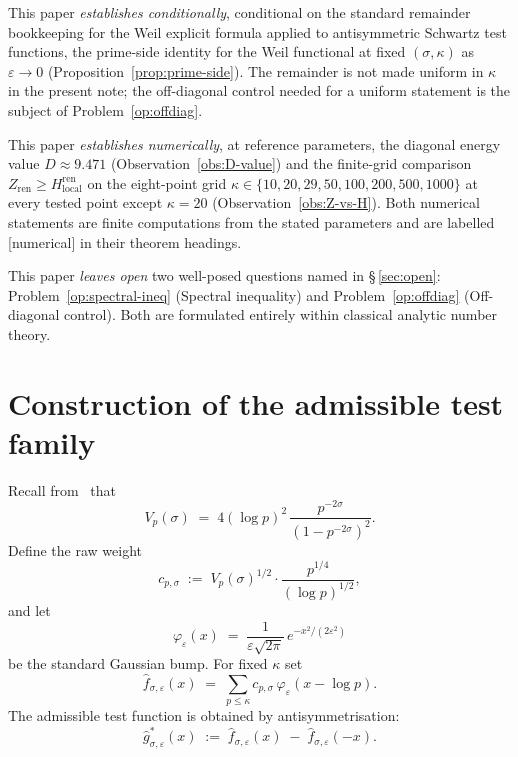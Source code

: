 \documentclass[11pt]{article}
\newcommand{\Hren}{H_{\mathrm{local}}^{\mathrm{ren}}}
\newcommand{\Zren}{Z_{\mathrm{ren}}}
\begin{document}
This paper \emph{establishes conditionally}, conditional on the
standard remainder bookkeeping for the Weil explicit formula
applied to antisymmetric Schwartz test functions, the prime-side
identity for the Weil functional at fixed $(\sigma,\kappa)$ as
$\varepsilon\to 0$ (Proposition~\ref{prop:prime-side}).
The remainder is not made uniform in $\kappa$ in the present
note; the off-diagonal control needed for a uniform statement is
the subject of Problem~\ref{op:offdiag}.

This paper \emph{establishes numerically}, at reference
parameters, the diagonal energy value $D\approx 9.471$
(Observation~\ref{obs:D-value}) and the finite-grid comparison
$\Zren\ge\Hren$ on the eight-point grid
$\kappa\in\{10,20,29,50,100,200,500,1000\}$ at every tested
point except $\kappa=20$ (Observation~\ref{obs:Z-vs-H}).
Both numerical statements are finite computations from the
stated parameters and are labelled [numerical] in their theorem
headings.

This paper \emph{leaves open} two well-posed questions named in
\S\,\ref{sec:open}:
Problem~\ref{op:spectral-ineq} (Spectral inequality) and
Problem~\ref{op:offdiag} (Off-diagonal control).
Both are formulated entirely within classical analytic number
theory.

\section{Construction of the admissible test family}
\label{sec:construct}

Recall from~\cite[Eq.~(3)]{Paper1} that
\[
V_p(\sigma)
\;=\; 4(\log p)^2\,\frac{p^{-2\sigma}}{(1-p^{-2\sigma})^2}.
\]
Define the raw weight
\[
c_{p,\sigma}
\;:=\; V_p(\sigma)^{1/2}
\cdot \frac{p^{1/4}}{(\log p)^{1/2}},
\]
and let
\[
\varphi_\varepsilon(x)
\;=\; \frac{1}{\varepsilon\sqrt{2\pi}}\,e^{-x^2/(2\varepsilon^2)}
\]
be the standard Gaussian bump.
For fixed $\kappa$ set
\[
\widehat f_{\sigma,\varepsilon}(x)
\;=\; \sum_{p\le\kappa} c_{p,\sigma}\,
       \varphi_\varepsilon(x-\log p).
\]
The admissible test function is obtained by antisymmetrisation:
\begin{equation}\label{eq:gstar}
\widehat g^*_{\sigma,\varepsilon}(x)
\;:=\; \widehat f_{\sigma,\varepsilon}(x)
       \;-\; \widehat f_{\sigma,\varepsilon}(-x).
\end{equation}
\end{document}

